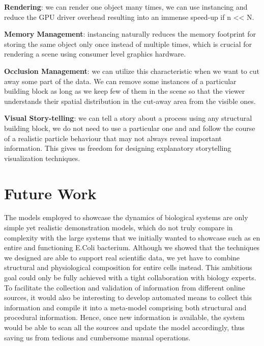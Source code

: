 \textbf{Rendering}: we can render one object many times, we can use instancing and reduce the GPU driver overhead resulting into an immense speed-up if n << N.

\textbf{Memory Management}: instancing naturally reduces the memory footprint for storing the same object only once instead of multiple times, which is crucial for rendering a scene using consumer level graphics hardware.

\textbf{Occlusion Management}: we can utilize this characteristic when we want to cut away some part of the data. 
We can remove some instances of a particular building block as long as we keep few of them in the scene so that the viewer understands their spatial distribution in the cut-away area from the visible ones.

\newpage

\textbf{Visual Story-telling}: we can tell a story about a process using any structural building block, we do not need to use a particular one and and follow the course of a realistic particle behaviour that may not always reveal important information.
This gives us freedom for designing explanatory storytelling visualization techniques.

\section{Future Work}

The models employed to showcase the dynamics of biological systems are only simple yet realistic demonstration models, which do not truly compare in complexity with the large systems that we initially wanted to showcase such as en entire and functioning E.Coli bacterium.
Although we showed that the techniques we designed are able to support real scientific data, we yet have to combine structural and physiological composition for entire cells instead.
This ambitious goal could only be fully achieved with a tight collaboration with biology experts.
To facilitate the collection and validation of information from different online sources, it would also be interesting to develop automated means to collect this information and compile it into a meta-model comprising both structural and procedural information.
Hence, once new information is available, the system would be able to scan all the sources and update the model accordingly, thus saving us from tedious and cumbersome manual operations.

